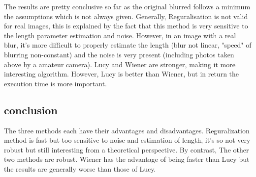  
The results are pretty conclusive so far as the original blurred follows a minimum the assumptions which is not always given. Generally, Reguralisation is not valid for real images, this is explained by the fact that this method is very sensitive to the length parameter estimation and noise. However, in an image with a real blur, it's more difficult to properly estimate the length (blur not linear, "speed" of blurring non-constant) and the noise is very present (including photos taken above by a amateur camera). Lucy and Wiener are stronger, making it more interesting algorithm. However, Lucy is better than Wiener, but in return the execution time is more important.

\subsection{conclusion}

The three methods each have their advantages and disadvantages. Reguralization method is fast but too sensitive to noise and estimation of length, it's so not very robust but still interesting from a theoretical perspective. By contrast, The other two methods are robust. Wiener has the advantage of being faster than Lucy but the results are generally worse than those of Lucy.
